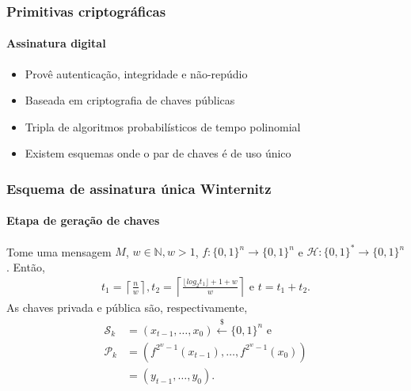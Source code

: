 \documentclass[12pt]{beamer}
\newcommand{\hh}{\mathcal{H}}
\newcommand{\pk}{\mathcal{P}_k}
\newcommand{\sk}{\mathcal{S}_k}
\newcommand{\binwds}[1]{\{0, 1\}^{#1}}
\newcommand{\fhash}[1]{\hh{}: \binwds{*} \longrightarrow{} \binwds{#1}}
\newcommand{\random}{\stackrel{\$}{\longleftarrow}}
\begin{document}
\begin{frame}
  \frametitle{Primitivas criptográficas}
  \framesubtitle{Assinatura digital}
  \begin{itemize}
    \item Provê autenticação, integridade e não-repúdio
    \item Baseada em criptografia de chaves públicas
    \item Tripla de algoritmos probabilísticos
      de tempo polinomial~\cite{Goldreich:2004:FCV:975541}
  \end{itemize}
  \begin{figure}
    \centering
  \end{figure}
  \begin{itemize}
    \item Existem esquemas onde o par de chaves é de uso único
  \end{itemize}
\end{frame}

\begin{frame}
  \frametitle{Esquema de assinatura única Winternitz}
  \framesubtitle{Etapa de geração de chaves}
  Tome uma mensagem $M$, $w \in \mathbb{N}, w > 1$,
  $f : \binwds{n} \longrightarrow \binwds{n}$ e $\fhash{n}$. Então,
  \begin{align*}
    t_1 = \left\lceil \frac{n}{w} \right\rceil,
    t_2 = \left\lceil \frac{\lfloor log_2 t_1 \rfloor + 1 + w}{w} \right\rceil
    \text{ e } t = t_1 + t_2.
  \end{align*}
  As chaves privada e pública são, respectivamente,
  \begin{align*}
    \sk{} &= (x_{t - 1}, \dots, x_{0}) \random{} \binwds{n} \text{ e}\\
    \pk{} &= (f^{2^w - 1}(x_{t - 1}), \dots, f^{2^w - 1}(x_0)) \\
          &= (y_{t - 1}, \dots, y_0).
   \end{align*}
\end{frame}
\end{document}
